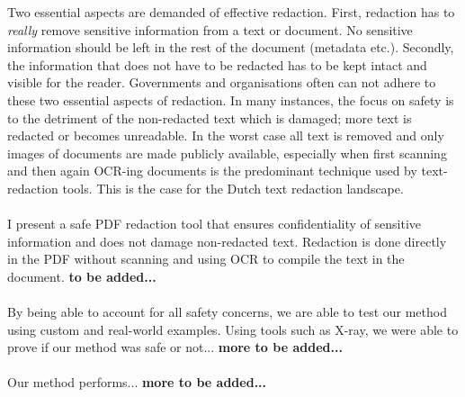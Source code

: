 Two essential aspects are demanded of effective redaction. First, redaction has to \textit{really} remove sensitive information from a text or document. No sensitive information should be left in the rest of the document (metadata etc.). Secondly, the information that does not have to be redacted has to be kept intact and visible for the reader. Governments and organisations often can not adhere to these two essential aspects of redaction. In many instances, the focus on safety is to the detriment of the non-redacted text which is damaged; more text is redacted or becomes unreadable. In the worst case all text is removed and only images of documents are made publicly available, especially when first scanning and then again OCR-ing documents is the predominant technique used by text-redaction tools. This is the case for the Dutch text redaction landscape.
\\\\
I present a safe PDF redaction tool that ensures confidentiality of sensitive information and does not damage non-redacted text. Redaction is done directly in the PDF without scanning and using OCR to compile the text in the document. \textbf{to be added...}
\\\\
By being able to account for all safety concerns, we are able to test our method using custom and real-world examples. Using tools such as X-ray, we were able to prove if our method was safe or not... \textbf{more to be added...}
\\\\
Our method performs... \textbf{more to be added...}



